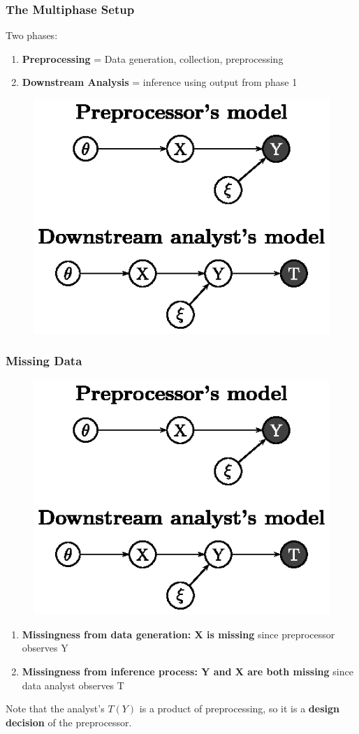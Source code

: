 \documentclass[10pt, compress]{beamer}
\begin{document}
\begin{frame}[fragile]
    \frametitle{The Multiphase Setup}

    Two phases:
    \begin{enumerate}
    \item \textbf{Preprocessing} = Data generation, collection, preprocessing
    \item \textbf{Downstream Analysis} = inference using output from phase 1
    \end{enumerate}
    
    \begin{figure}[h!]
    \centering
    \includegraphics[width=.6\textwidth]{assets/two_phase_setting.ps}
    \end{figure}

\end{frame}

\begin{frame}[fragile]
    \frametitle{Missing Data}
    \begin{figure}[h!]
    \centering
    \includegraphics[width=.5\textwidth]{assets/two_phase_setting.ps}
    \end{figure}   
    \begin{enumerate}
    \item \textbf{Missingness from data generation: X is missing} since preprocessor observes Y
    \item \textbf{Missingness from inference process: Y and X are both missing} since data analyst observes T
    \end{enumerate}
    
    Note that the analyst's $T(Y)$ is a product of preprocessing, so it is a \textbf{design decision} of the preprocessor.

\end{frame}
\end{document}
